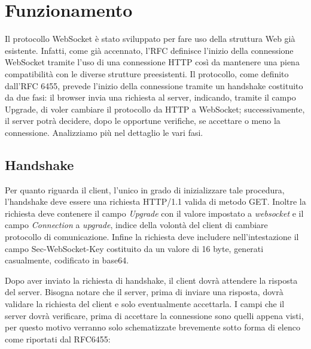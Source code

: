 \documentclass[
  oneside,
  11pt, a4paper,
  footinclude=true,
  headinclude=true,
  cleardoublepage=empty
]{scrbook}
\begin{document}
\chapter{Funzionamento}
Il protocollo WebSocket è stato sviluppato per fare uso della struttura Web già esistente.
Infatti, come già accennato, l'RFC definisce l'inizio della connessione WebSocket tramite l'uso di una connessione HTTP così da mantenere una piena compatibilità con le diverse strutture preesistenti.
Il protocollo, come definito dall'RFC 6455, prevede l'inizio della connessione tramite un handshake costituito da due fasi: il browser invia una richiesta al server, indicando, tramite il campo Upgrade, di voler cambiare il protocollo da HTTP a WebSocket; successivamente, il server potrà decidere, dopo le opportune verifiche, se accettare o meno la connessione.
Analizziamo più nel dettaglio le vari fasi.

\section{Handshake}
Per quanto riguarda il client, l'unico in grado di inizializzare tale procedura, l'handshake deve essere una richiesta HTTP/1.1 valida di metodo GET.
Inoltre la richiesta deve contenere il campo \textit{Upgrade} con il valore impostato a \textit{websocket} e il campo \textit{Connection} a \textit{upgrade}, indice della volontà del client di cambiare protocollo di comunicazione.
Infine la richiesta deve includere nell'intestazione il campo Sec-WebSocket-Key costituito da un valore di 16 byte, generati casualmente, codificato in base64.


Dopo aver inviato la richiesta di handshake, il client dovrà attendere la risposta del server.
Bisogna notare che il server, prima di inviare una risposta, dovrà validare la richiesta del client e solo eventualmente accettarla.
I campi che il server dovrà verificare, prima di accettare la connessione sono quelli appena visti, per questo motivo verranno solo schematizzate brevemente sotto forma di elenco come riportati dal RFC6455:
\end{document}
